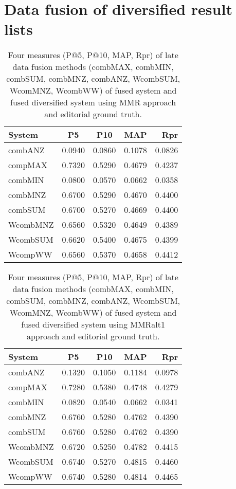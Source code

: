 \section{Data fusion of diversified result lists}

\begin{table}[H]
\begin{center}
\scriptsize
\caption{Four measures (P@5, P@10, MAP, Rpr) of late data fusion methods (combMAX, combMIN, combSUM, combMNZ, combANZ, WcombSUM, WcomMNZ, WcombWW) of fused system and fused diversified system using MMR approach and editorial ground truth.}

\begin{tabular}{lcccr}
System & P\@5 & P\@10 & MAP & Rpr \\
\midrule
combANZ & 0.0940 & 0.0860 & 0.1078 & 0.0826 \\
compMAX & 0.7320 & 0.5290 & 0.4679 & 0.4237 \\
combMIN & 0.0800 & 0.0570 & 0.0662 & 0.0358 \\
combMNZ & 0.6700 & 0.5290 & 0.4670 & 0.4400 \\
combSUM & 0.6700 & 0.5270 & 0.4669 & 0.4400 \\
WcombMNZ & 0.6560 & 0.5320 & 0.4649 & 0.4389 \\
WcombSUM & 0.6620 & 0.5400 & 0.4675 & 0.4399 \\
WcompWW & 0.6560 & 0.5370 & 0.4658 & 0.4412 \\
\bottomrule
\end{tabular}
\end{center}
\end{table}

\begin{table}[H]
\begin{center}
\scriptsize
\caption{Four measures (P@5, P@10, MAP, Rpr) of late data fusion methods (combMAX, combMIN, combSUM, combMNZ, combANZ, WcombSUM, WcomMNZ, WcombWW) of fused system and fused diversified system using MMRalt1 approach and editorial ground truth.}

\begin{tabular}{lcccr}

\midrule
System & P\@5 & P\@10 & MAP & Rpr \\
\midrule
combANZ & 0.1320 & 0.1050 & 0.1184 & 0.0978 \\
compMAX & 0.7280 & 0.5380 & 0.4748 & 0.4279 \\
combMIN & 0.0820 & 0.0540 & 0.0662 & 0.0341 \\
combMNZ & 0.6760 & 0.5280 & 0.4762 & 0.4390 \\
combSUM & 0.6760 & 0.5280 & 0.4762 & 0.4390 \\
WcombMNZ & 0.6720 & 0.5250 & 0.4782 & 0.4415 \\
WcombSUM & 0.6740 & 0.5270 & 0.4815 & 0.4460 \\
WcompWW & 0.6740 & 0.5280 & 0.4814 & 0.4465 \\
\bottomrule
\end{tabular}
\end{center}
\end{table}


